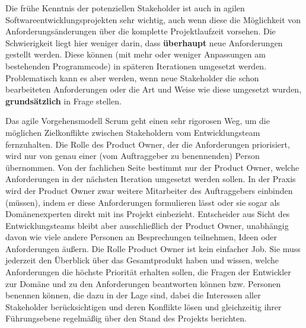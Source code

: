 \vspace{\baselineskip} %


Die frühe Kenntnis der potenziellen Stakeholder ist auch in agilen Softwareentwicklungsprojekten sehr wichtig, auch wenn diese die Möglichkeit von Anforderungs\-änderungen über die komplette Projektlaufzeit vorsehen. Die Schwierigkeit liegt hier weniger darin, dass \textbf{überhaupt} neue Anforderungen gestellt werden. Diese können (mit mehr oder weniger Anpassungen am bestehenden Programmcode) in späteren Iterationen umgesetzt werden. Problematisch kann es aber werden, wenn neue Stake\-holder die schon bearbeiteten Anforderungen oder die Art und Weise wie diese umgesetzt wurden, \textbf{grundsätzlich} in Frage stellen. 

\vspace{1.5mm} %

Das agile Vorgehensmodell Scrum geht einen sehr rigorosen Weg, um die möglichen Zielkonflikte zwischen Stakeholdern vom Entwicklungsteam fernzuhalten. Die  Rolle des Product Owner, der die Anforderungen priorisiert, wird nur von genau einer (vom Auftraggeber zu benennenden) Person übernommen. Von der fachlichen Seite bestimmt nur der Product Owner, welche Anforderungen in der nächsten Iteration umgesetzt werden sollen. In der Praxis wird der Product Owner zwar weitere Mit\-arbeiter des Auftraggebers einbinden (müssen), indem er diese Anforderungen formulieren lässt oder sie sogar als Domänenexperten direkt mit ins Projekt einbezieht. Entscheider aus Sicht des Entwicklungsteams bleibt aber ausschließlich der Product Owner, unabhängig davon wie viele andere Personen an Besprechungen teilnehmen, Ideen oder Anforderungen äußern. Die Rolle Product Owner ist kein einfacher Job. Sie muss jederzeit den Überblick über das Gesamtprodukt haben und wissen, welche Anforderungen die höchste Priorität erhalten sollen, die Fragen der Entwickler zur Domäne und zu den Anforderungen beantworten können bzw. Personen benennen können, die dazu in der Lage sind, dabei die Interessen aller Stakeholder berücksichtigen und deren Konflikte lösen und gleichzeitig ihrer Führungsebene regelmäßig über den Stand des Projekts berichten.

\vspace{\baselineskip} %


